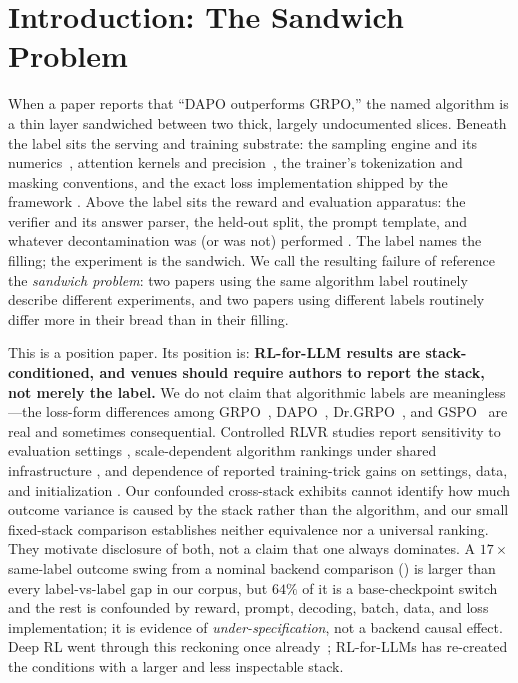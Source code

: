 \section{Introduction: The Sandwich Problem}
\label{sec:p5-intro}
When a paper reports that ``DAPO outperforms GRPO,'' the named algorithm is a
thin layer sandwiched between two thick, largely undocumented slices. Beneath the
label sits the serving and training substrate: the sampling engine and its
numerics~\citep{kwon2023vllm, zheng2024sglang}, attention kernels and
precision~\citep{dao2022flashattention}, the trainer's tokenization and masking
conventions, and the exact loss implementation shipped by the framework
\citep{vonwerra2022trl, sheng2024verl, hu2024openrlhf, thinkingmachines2024tinker}.
Above the label sits the reward and evaluation apparatus: the verifier and its
answer parser, the held-out split, the prompt template, and whatever
decontamination was (or was not) performed \citep{zhang2024gsm1k,
riddell2024contamination}. The label names the filling; the experiment is the
sandwich. We call the resulting failure of reference the \emph{sandwich problem}:
two papers using the same algorithm label routinely describe different
experiments, and two papers using different labels routinely differ more in their
bread than in their filling.

This is a position paper. Its position is: \textbf{RL-for-LLM results are
stack-conditioned, and venues should require authors to report the stack, not
merely the label.} We do not claim that algorithmic labels are meaningless---the
loss-form differences among GRPO~\citep{shao2024deepseekmath, guo2025deepseekr1},
DAPO~\citep{yu2025dapo}, Dr.GRPO~\citep{tong2025drgrpo}, and
GSPO~\citep{qwen2025gspo} are real and sometimes consequential. Controlled
RLVR studies report sensitivity to evaluation settings
\citep{hochlehnert2025sober}, scale-dependent algorithm rankings under shared
infrastructure \citep{li2026oxrl}, and dependence of reported training-trick
gains on settings, data, and initialization \citep{liu2025tricks}. Our
confounded cross-stack exhibits cannot identify how much outcome variance is
caused by the stack rather than the algorithm, and our small fixed-stack
comparison establishes neither equivalence nor a universal ranking. They
motivate disclosure of both, not a claim that one always dominates. A $17\times$
same-label outcome swing from a nominal backend comparison ()
is larger than every label-vs-label gap in our corpus, but $64\%$ of it is a
base-checkpoint switch and the rest is confounded by reward, prompt, decoding,
batch, data, and loss implementation; it is evidence of \emph{under-specification},
not a backend causal effect. Deep RL went through this reckoning once
already~\citep{henderson2018deep, colas2019hitchhiker, agarwal2021deep};
RL-for-LLMs has re-created the conditions with a larger and less inspectable
stack.

